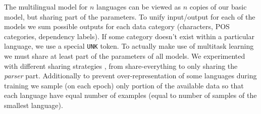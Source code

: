 The multilingual model for $n$ languages can be viewed as $n$ copies of our
basic model, but sharing part of the parameters. To unify input/output for each
of the models we sum possible outputs for each data category (characters,
POS categories, dependency labels). If some category doesn't exist within
a particular language, we use a special \texttt{UNK} token. 
To actually make use of multitask learning we must share at least part of the
parameters of all models. We experimented with different sharing strategies
, from share-everything to only sharing the  \textit{parser} part. Additionally
to prevent over-representation of some
languages during training we sample (on each epoch) only portion of the available
data so that each language have equal number of examples (equal to number of samples
of the smallest language).
